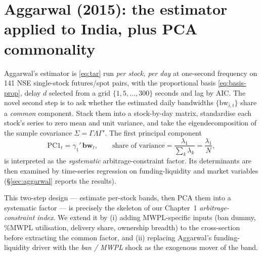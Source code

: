 \section{Aggarwal (2015): the estimator applied to India, plus PCA commonality}
\label{sec:aggarwal-method}
Aggarwal's estimator is \eqref{eq:tar} run \emph{per stock, per day} at one-second frequency on 141 NSE single-stock futures/spot pairs, with the proportional basis \eqref{eq:basis-prop}, delay $d$ selected from a grid $\{1,5,\dots,300\}$ seconds and lag by AIC. The novel second step is to ask whether the estimated daily bandwidths $\{\text{bw}_{i,t}\}$ share a \emph{common} component. Stack them into a stock-by-day matrix, standardise each stock's series to zero mean and unit variance, and take the eigendecomposition of the sample covariance $\Sigma = \Gamma\Lambda\Gamma'$. The first principal component
\begin{equation}
\mathrm{PC1}_t = \gamma_1' \,\mathbf{bw}_t, \qquad \text{share of variance} = \frac{\lambda_1}{\sum_{k}\lambda_k}=\frac{\lambda_1}{N}, \label{eq:pca}
\end{equation}
is interpreted as the \emph{systematic} arbitrage-constraint factor. Its determinants are then examined by time-series regression on funding-liquidity and market variables (\S\ref{sec:aggarwal} reports the results).

\begin{takeaway}
This two-step design --- estimate per-stock bands, then PCA them into a systematic factor --- is precisely the skeleton of our Chapter~1 \emph{arbitrage-constraint index}. We extend it by (i) adding MWPL-specific inputs (ban dummy, \%MWPL utilisation, delivery share, ownership breadth) to the cross-section before extracting the common factor, and (ii) replacing Aggarwal's funding-liquidity driver with the \emph{ban / MWPL} shock as the exogenous mover of the band.
\end{takeaway}

